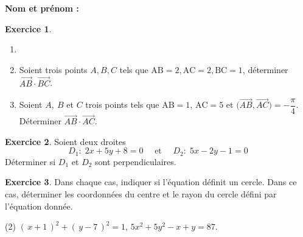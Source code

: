 \documentclass{article}
\theoremstyle{definition}
\newtheorem{exercice}{Exercice}
\begin{document}
\pagestyle{fancy}

\fancyhf{} %
\fancyhead[L]{\large \textbf{\Niveau}}
\fancyhead[C]{\large \textbf{\Chapitre}}

\large

\textbf{Nom et prénom :}\enspace\dotfill

\begin{exercice}
  \begin{enumerate}
    \item[]
    \item Soient trois points $A, B, C$ tels que \(\mathrm{AB} = 2, \mathrm{AC} = 2, \mathrm{BC} = 1\), déterminer $\overrightarrow{AB} \cdot \overrightarrow{BC}$.
    \item Soient \(A,\ B\) et \(C\) trois points tels que \(\mathrm{AB} = 1\), \(\mathrm{AC} = 5\) et \(\bigl(\overrightarrow{AB}, \overrightarrow{AC}\bigr) = -\dfrac{\pi}{4}\).
      Déterminer \(\overrightarrow{AB}\cdot\overrightarrow{AC}\).
  \end{enumerate}
\end{exercice}

\vfill

\begin{exercice}
  Soient deux droites
  $$D_1 :\; 2x + 5y + 8 = 0 \quad \text{ et } \quad D_2 :\; 5x - 2y - 1 = 0$$
  Déterminer si $D_1$ et $D_2$ sont perpendiculaires.
\end{exercice}

\vfill

\begin{exercice}
  Dans chaque cas, indiquer si l'équation définit un cercle. Dans ce cas, déterminer les coordonnées du centre et le rayon du cercle défini par l'équation donnée.
  \begin{tasks}(2)
    \task $(\,x + 1\,)^2 + (\,y - 7\,)^2 = 1$,
    \task $5x^2 + 5y^2 - x + y = 87$.
  \end{tasks}
\end{exercice}

\vfill
\end{document}
